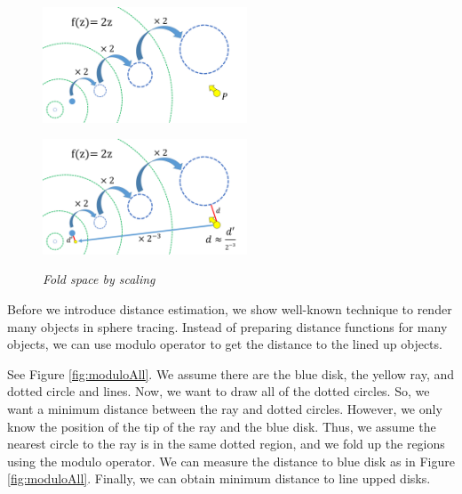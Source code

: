 \begin{figure}[htbp]
 \begin{minipage}[t]{0.5\hsize}
  \center
  \includegraphics[height=1.35in, keepaspectratio]{img/visualization/scaling1.png}
  \subcaption{\textit{}}
  \label{fig:iisScale1}
  \hspace*{\fill}
 \end{minipage}
 \begin{minipage}[t]{0.5\hsize}
  \center
  \includegraphics[height=1.35in, keepaspectratio]{img/visualization/scaling2.png}
  \subcaption{\textit{}}
  \label{fig:iisScale2}
  \hspace*{\fill}
 \end{minipage}
 \caption{\textit{Fold space by scaling}}
 \label{fig:iisScaleAll}
\end{figure}

Before we introduce distance estimation, we show
well-known technique to render many objects in sphere tracing.
Instead of preparing distance functions for many objects, we can use modulo operator
to get the distance to the lined up objects.

See Figure \ref{fig:moduloAll}. We assume there are the blue disk, the
yellow ray, and dotted circle and lines.
Now, we want to draw all of the dotted circles.
So, we want a minimum distance between the ray and dotted circles.
However, we only know the position of the tip of the ray and the blue disk.
Thus, we assume the nearest circle to the ray is in the same dotted region, and
we fold up the regions using the modulo operator.
We can measure the distance to blue disk as in Figure \ref{fig:moduloAll}.
Finally, we can obtain minimum distance to line upped disks.

